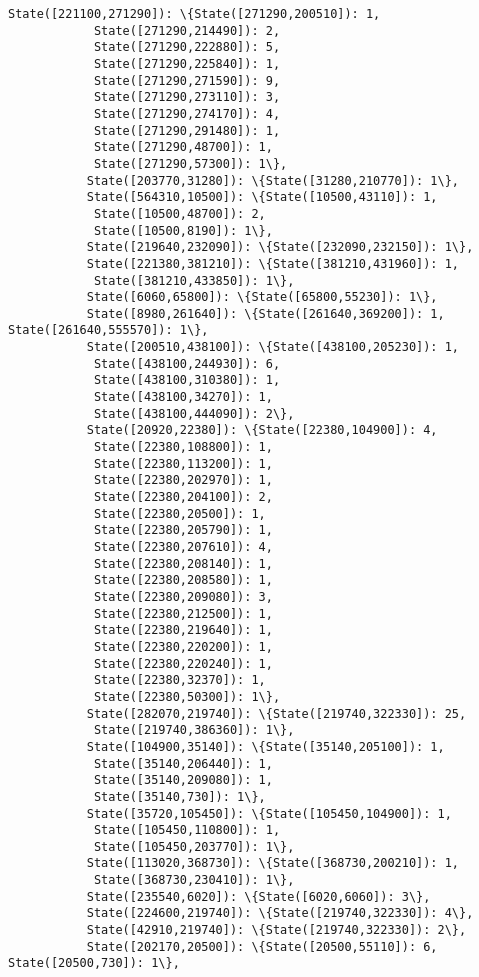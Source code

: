 \documentclass[11pt]{article}
\begin{document}
\begin{Verbatim}[commandchars=\\\{\}]
           State([221100,271290]): \{State([271290,200510]): 1,
            State([271290,214490]): 2,
            State([271290,222880]): 5,
            State([271290,225840]): 1,
            State([271290,271590]): 9,
            State([271290,273110]): 3,
            State([271290,274170]): 4,
            State([271290,291480]): 1,
            State([271290,48700]): 1,
            State([271290,57300]): 1\},
           State([203770,31280]): \{State([31280,210770]): 1\},
           State([564310,10500]): \{State([10500,43110]): 1,
            State([10500,48700]): 2,
            State([10500,8190]): 1\},
           State([219640,232090]): \{State([232090,232150]): 1\},
           State([221380,381210]): \{State([381210,431960]): 1,
            State([381210,433850]): 1\},
           State([6060,65800]): \{State([65800,55230]): 1\},
           State([8980,261640]): \{State([261640,369200]): 1, State([261640,555570]): 1\},
           State([200510,438100]): \{State([438100,205230]): 1,
            State([438100,244930]): 6,
            State([438100,310380]): 1,
            State([438100,34270]): 1,
            State([438100,444090]): 2\},
           State([20920,22380]): \{State([22380,104900]): 4,
            State([22380,108800]): 1,
            State([22380,113200]): 1,
            State([22380,202970]): 1,
            State([22380,204100]): 2,
            State([22380,20500]): 1,
            State([22380,205790]): 1,
            State([22380,207610]): 4,
            State([22380,208140]): 1,
            State([22380,208580]): 1,
            State([22380,209080]): 3,
            State([22380,212500]): 1,
            State([22380,219640]): 1,
            State([22380,220200]): 1,
            State([22380,220240]): 1,
            State([22380,32370]): 1,
            State([22380,50300]): 1\},
           State([282070,219740]): \{State([219740,322330]): 25,
            State([219740,386360]): 1\},
           State([104900,35140]): \{State([35140,205100]): 1,
            State([35140,206440]): 1,
            State([35140,209080]): 1,
            State([35140,730]): 1\},
           State([35720,105450]): \{State([105450,104900]): 1,
            State([105450,110800]): 1,
            State([105450,203770]): 1\},
           State([113020,368730]): \{State([368730,200210]): 1,
            State([368730,230410]): 1\},
           State([235540,6020]): \{State([6020,6060]): 3\},
           State([224600,219740]): \{State([219740,322330]): 4\},
           State([42910,219740]): \{State([219740,322330]): 2\},
           State([202170,20500]): \{State([20500,55110]): 6, State([20500,730]): 1\},

\end{Verbatim}
\end{document}

